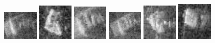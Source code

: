 \begin{figure}
    \includegraphics[width=0.15\textwidth]{chapters/images/dataset/all-class-images/drinkCarton/drinkCarton-107.jpg}
    \includegraphics[width=0.15\textwidth]{chapters/images/dataset/all-class-images/drinkCarton/drinkCarton-152.jpg}
    \includegraphics[width=0.15\textwidth]{chapters/images/dataset/all-class-images/drinkCarton/drinkCarton-92.jpg}
    \includegraphics[width=0.15\textwidth]{chapters/images/dataset/all-class-images/drinkCarton/drinkCarton-100.jpg}
    \includegraphics[width=0.15\textwidth]{chapters/images/dataset/all-class-images/drinkCarton/drinkCarton-317.jpg}
    \includegraphics[width=0.15\textwidth]{chapters/images/dataset/all-class-images/drinkCarton/drinkCarton-18.jpg}
    

\end{figure}
